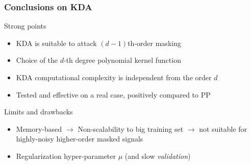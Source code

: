 \begin{frame}
\frametitle{Conclusions on KDA}
\begin{block}{Strong points}
\begin{itemize}
\item KDA is suitable to attack $(d-1)$th-order masking
\item Choice of the $d$-th degree polynomial kernel function
\item KDA computational complexity is independent from the order $d$
\item Tested and effective on a real case, positively compared to PP 
\end{itemize}
\end{block}

\begin{block}{Limits and drawbacks}
\begin{itemize}
\item Memory-based $\rightarrow$ Non-scalability to big training set $\rightarrow$ not suitable for highly-noisy higher-order masked signals
\item Regularization hyper-parameter $\mu$ (and slow \emph{validation})
\end{itemize}
\end{block}

\end{frame}